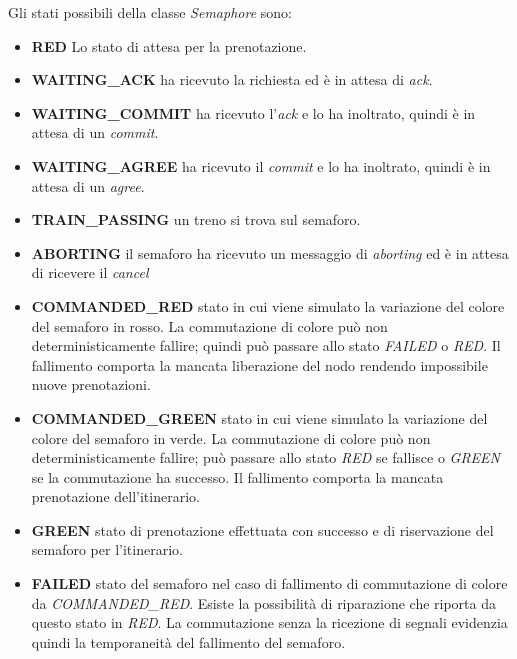 Gli stati possibili della classe \textit{Semaphore} sono:
\begin{itemize}
  \item \textbf{RED} Lo stato di attesa per la prenotazione.
  \item \textbf{WAITING\_ACK} ha ricevuto la richiesta ed è in attesa di
  \textit{ack}.
  \item \textbf{WAITING\_COMMIT} ha ricevuto l'\textit{ack} e lo ha inoltrato,
  quindi è in attesa di un \textit{commit}. 
  \item \textbf{WAITING\_AGREE} ha ricevuto il \textit{commit} e lo ha
  inoltrato, quindi è in attesa di un \textit{agree}. 
  \item \textbf{TRAIN\_PASSING} un treno si trova sul semaforo.
  \item \textbf{ABORTING} il semaforo ha ricevuto un messaggio di
  \textit{aborting} ed è in attesa di ricevere il \textit{cancel}
  \item \textbf{COMMANDED\_RED} stato in cui viene simulato la variazione del colore del semaforo in rosso. 
  La commutazione di colore può non deterministicamente fallire; quindi può passare allo stato \textit{FAILED} o \textit{RED}. Il fallimento comporta la mancata liberazione del nodo rendendo impossibile nuove prenotazioni.
  \item \textbf{COMMANDED\_GREEN} stato in cui viene simulato la variazione del colore del semaforo in verde. 
  La commutazione di colore può non deterministicamente fallire; può passare allo stato \textit{RED} se fallisce o \textit{GREEN} se la commutazione ha successo. Il fallimento comporta la mancata prenotazione dell'itinerario.
  \item \textbf{GREEN} stato di prenotazione effettuata con successo e di
  riservazione del semaforo per l'itinerario.
  \item \textbf{FAILED} stato del semaforo nel caso di fallimento di
  commutazione di colore da \textit{COMMANDED\_RED}. Esiste la possibilità di riparazione che riporta da questo stato in \textit{RED}.  La commutazione senza la ricezione di segnali evidenzia quindi la temporaneità del fallimento del semaforo.
   
\end{itemize}
